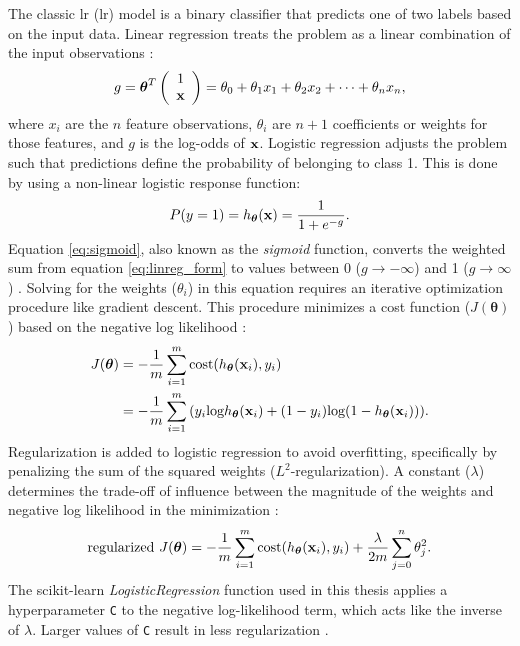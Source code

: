 The classic \acrlong{lr} (\acrshort{lr}) model is a binary classifier that predicts one of two labels based on the input data. Linear regression treats the problem as a linear combination of the input observations \citep[p.\ 369]{bertsimas_analytics_2016}:
\begin{equation}
\label{eq:linreg_form}
    g = {\boldsymbol\theta}^T\left(\begin{array}{c}1\\{\bf x}\end{array}\right) = \theta_0 + \theta_1x_1 + \theta_2x_2 + \cdots + \theta_nx_n, 
\end{equation}
where $x_i$ are the $n$ feature observations, $\theta_i$ are $n+1$ coefficients or weights for those features, and $g$ is the log-odds of $\bf x$. Logistic regression adjusts the problem such that predictions define the probability of belonging to class 1. This is done by using a non-linear logistic response function: 
\begin{equation}
\label{eq:sigmoid}
P(y=1)=h_{\boldsymbol\theta}({\bf x}) = \frac{1}{1+e^{-g}}.
\end{equation}
Equation \ref{eq:sigmoid}, also known as the \textit{sigmoid} function, converts the weighted sum from equation \ref{eq:linreg_form} to values between 0 ($g\to-\infty$) and 1 ($g\to\infty$) \citep[p.\ 369]{bertsimas_analytics_2016}. Solving for the weights ($\theta_i$) in this equation requires an iterative optimization procedure like gradient descent. This procedure minimizes a cost function ($J(\boldsymbol\theta)$) based on the negative log likelihood \citep{ng_logistic_2011}:
\begin{equation}
\label{eq:logreg_cost}
\begin{aligned}
        J(\boldsymbol\theta) &= -\frac{1}{m} \sum_{i=1}^{m}{\text{cost}(h_{\boldsymbol\theta}({\bf x}_i),y_i)} \\ &= -\frac{1}{m}\sum_{i=1}^{m}{(y_i\text{log}{h_{\boldsymbol\theta}({\bf x}_i)}+(1-y_i)\text{log}(1-h_{\boldsymbol\theta}({\bf x}_i)))}.
\end{aligned}
\end{equation}
Regularization is added to logistic regression to avoid overfitting, specifically by penalizing the sum of the squared weights ($L^2$-regularization). A constant ($\lambda$) determines the trade-off of influence between the magnitude of the weights and negative log likelihood in the minimization \citep{ng_regularization_2011}:
\begin{equation}
\label{eq:logreg_cost_reg}
    \text{regularized}~J(\boldsymbol\theta) = -\frac{1}{m}\sum_{i=1}^{m}{\text{cost}(h_{\boldsymbol\theta}({\bf x}_i),y_i) + \frac{\lambda}{2m}\sum_{j=0}^{n}{\theta_j^2}}.
\end{equation}
The scikit-learn \textit{LogisticRegression} function used in this thesis applies a hyperparameter \verb|C| to the negative log-likelihood term, which acts like the inverse of $\lambda$. Larger values of \verb|C| result in less regularization \citep{scikit-learn_logistic_2021}.

